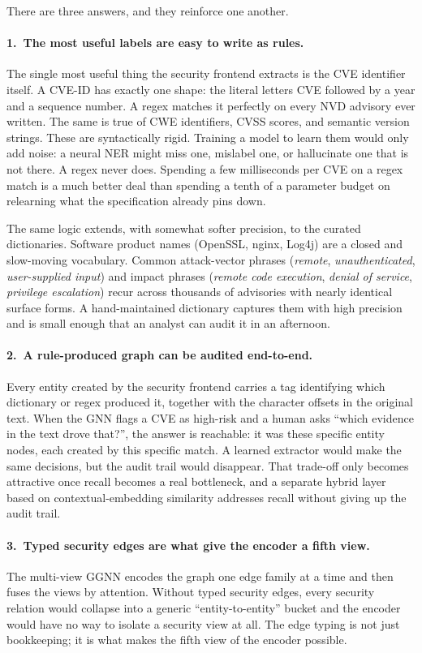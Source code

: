 \documentclass[11pt,a4paper]{article}
\begin{document}
There are three answers, and they reinforce one another.

\paragraph{1.\ The most useful labels are easy to write as
rules.}
The single most useful thing the security frontend extracts
is the CVE identifier itself. A CVE-ID has exactly one shape:
the literal letters CVE followed by a year and a sequence
number. A regex matches it perfectly on every NVD advisory
ever written. The same is true of CWE identifiers, CVSS
scores, and semantic version strings. These are
syntactically rigid. Training a model to learn them would
only add noise: a neural NER might miss one, mislabel one,
or hallucinate one that is not there. A regex never does.
Spending a few milliseconds per CVE on a regex match is a
much better deal than spending a tenth of a parameter budget
on relearning what the specification already pins down.

The same logic extends, with somewhat softer precision, to
the curated dictionaries. Software product names (OpenSSL,
nginx, Log4j) are a closed and slow-moving vocabulary.
Common attack-vector phrases (\emph{remote},
\emph{unauthenticated}, \emph{user-supplied input}) and
impact phrases (\emph{remote code execution}, \emph{denial
of service}, \emph{privilege escalation}) recur across
thousands of advisories with nearly identical surface forms.
A hand-maintained dictionary captures them with high
precision and is small enough that an analyst can audit it
in an afternoon.

\paragraph{2.\ A rule-produced graph can be audited
end-to-end.}
Every entity created by the security frontend carries a
tag identifying which dictionary or regex produced it,
together with the character offsets in the original text.
When the GNN flags a CVE as high-risk and a human asks
``which evidence in the text drove that?'', the answer is
reachable: it was these specific entity nodes, each
created by this specific match. A learned extractor would
make the same decisions, but the audit trail would
disappear. That trade-off only becomes attractive once
recall becomes a real bottleneck, and a separate hybrid
layer based on contextual-embedding similarity addresses
recall without giving up the audit trail.

\paragraph{3.\ Typed security edges are what give the
encoder a fifth view.}
The multi-view GGNN encodes the graph one edge family at a
time and then fuses the views by attention. Without typed
security edges, every security relation would collapse into
a generic ``entity-to-entity'' bucket and the encoder would
have no way to isolate a security view at all. The edge
typing is not just bookkeeping; it is what makes the fifth
view of the encoder possible.
\end{document}
